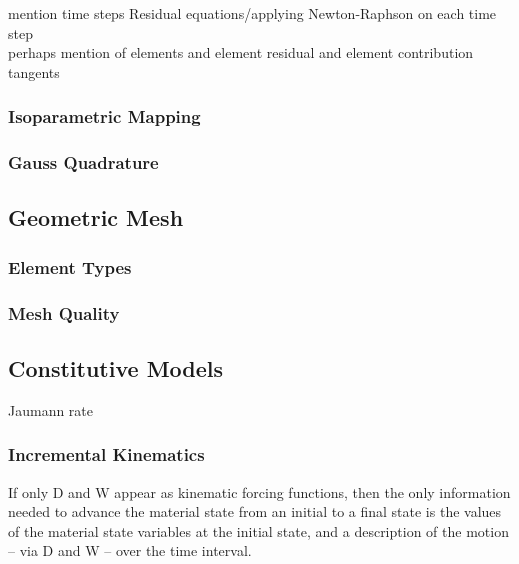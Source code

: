 mention time steps
Residual equations/applying Newton-Raphson on each time step \\

perhaps mention of elements and element residual and element contribution \\

tangents



\subsubsection{Isoparametric Mapping}

\subsubsection{Gauss Quadrature}

\subsection{Geometric Mesh}

\subsubsection{Element Types}

\subsubsection{Mesh Quality}

\subsection{Constitutive Models}

Jaumann rate

\subsubsection{Incremental Kinematics}

If only D and W appear as kinematic forcing functions, then the only information needed to advance the material state from an initial to a final state is the values of the material state variables at the initial state, and a description of the motion – via D and W – over the time interval.

